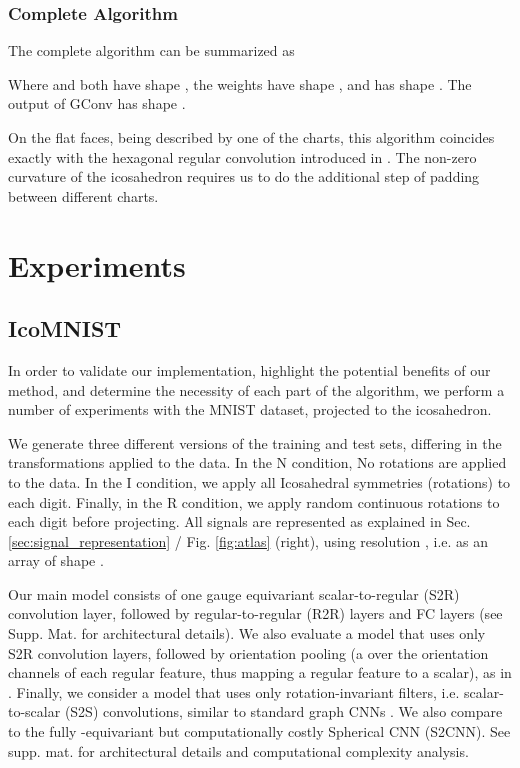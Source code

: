 \documentclass{article}
\begin{document}
\subsubsection{Complete Algorithm}

The complete algorithm can be summarized as

Where  and  both have shape , the weights  have shape , and  has shape .
The output of GConv has shape .

On the flat faces, being described by one of the charts, this algorithm coincides exactly with the hexagonal regular convolution introduced in \cite{hoogeboomHexaConv2018}.
The non-zero curvature of the icosahedron requires us to do the additional step of padding between different charts.


\section{Experiments}
\label{sec:experiments}

\subsection{IcoMNIST}

In order to validate our implementation, highlight the potential benefits of our method, and determine the necessity of each part of the algorithm, we perform a number of experiments with the MNIST dataset, projected to the icosahedron.

We generate three different versions of the training and test sets, differing in the transformations applied to the data.
In the N condition, No rotations are applied to the data.
In the I condition, we apply all  Icosahedral symmetries (rotations) to each digit.
Finally, in the R condition, we apply  random continuous rotations  to each digit before projecting.
All signals are represented as explained in Sec. \ref{sec:signal_representation} / Fig. \ref{fig:atlas} (right), using resolution , i.e. as an array of shape .

Our main model consists of one gauge equivariant scalar-to-regular (S2R) convolution layer, followed by  regular-to-regular (R2R) layers and  FC layers (see Supp. Mat. for architectural details).
We also evaluate a model that uses only S2R convolution layers, followed by orientation pooling (a  over the  orientation channels of each regular feature, thus mapping a regular feature to a scalar), as in \cite{masciGeodesicConvolutionalNeural2015}.
Finally, we consider a model that uses only rotation-invariant filters, i.e. scalar-to-scalar (S2S) convolutions, similar to standard graph CNNs \cite{boscainiLearningClassSpecific2015, kipfSemiSupervisedClassificationGraph2017}.
We also compare to the fully -equivariant but computationally costly Spherical CNN (S2CNN).
See supp. mat. for architectural details and computational complexity analysis.
\end{document}
